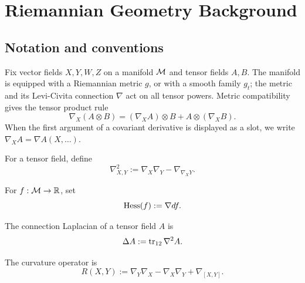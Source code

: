 \chapter{Riemannian Geometry Background}

\section{Notation and conventions}

Fix vector fields $X,Y,W,Z$ on a manifold $\mathcal{M}$ and tensor fields $A,B$. The
manifold is equipped with a Riemannian metric $g$, or with a smooth family
$g_t$; the metric and its Levi-Civita connection $\nabla$ act on all tensor
powers. Metric compatibility gives the tensor product rule
\[
\nabla_X(A\otimes B)=(\nabla_XA)\otimes B+A\otimes(\nabla_XB).
\]
When the first argument of a covariant derivative is displayed as a slot, we
write $\nabla_XA=\nabla A(X,\ldots)$.

\begin{definition}
\label{topping:notn-second-covariant-derivative}
\leanok
For a tensor field, define
\[
\nabla^2_{X,Y}:=\nabla_X\nabla_Y-\nabla_{\nabla_XY}.
\]
\end{definition}

\begin{definition}[Hessian]
\label{topping:notn-hessian}
\leanok
For $f:\mathcal{M}\to\mathbb{R}$, set
\[
\operatorname{Hess}(f):=\nabla df.
\]
\end{definition}

\begin{definition}
\label{topping:notn-rough-laplacian}
\leanok
The connection Laplacian of a tensor field $A$ is
\[
\Delta A:=\operatorname{tr}_{12}\nabla^2A.
\]
\end{definition}

\begin{definition}
\label{topping:notn-curvature-operator}
\leanok
The curvature operator is
\[
R(X,Y):=\nabla_Y\nabla_X-\nabla_X\nabla_Y+\nabla_{[X,Y]}.
\]
\end{definition}

